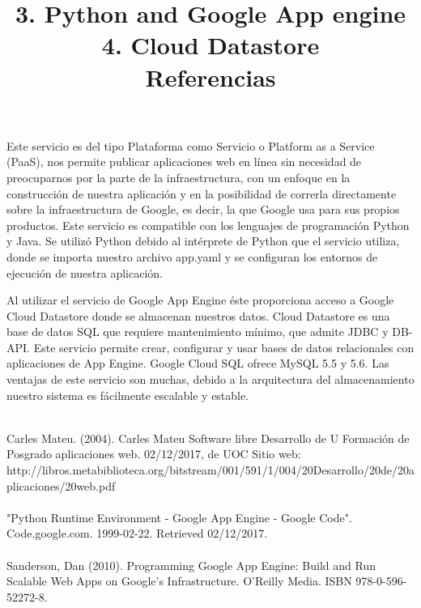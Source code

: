 \documentclass[a4paper,10pt]{article}
\begin{document}
\maketitle
\title{\textbf{\large{3. Python and Google App engine}}\\}
Este servicio es del tipo Plataforma como Servicio o Platform as a Service (PaaS), nos permite publicar aplicaciones web en línea sin necesidad de preocuparnos por la parte de la infraestructura, con un enfoque en la construcción de nuestra aplicación y en la posibilidad de correrla directamente sobre la infraestructura de Google, es decir, la que Google usa para sus propios productos. Este servicio es compatible con los lenguajes de programación Python y Java. 
Se utilizó Python debido al intérprete de Python que el servicio utiliza, donde se importa nuestro archivo app.yaml y se configuran los entornos de ejecución de nuestra aplicación.
\\
\medskip

\maketitle
\title{\textbf{\large{4. Cloud Datastore}}\\}
Al utilizar el servicio de Google App Engine éste proporciona acceso a Google Cloud Datastore donde se almacenan nuestros datos. Cloud Datastore es una base de datos SQL que requiere mantenimiento mínimo, que admite JDBC y DB-API. Este servicio permite crear, configurar y usar bases de datos relacionales con aplicaciones de App Engine. Google Cloud SQL ofrece MySQL 5.5 y 5.6.
Las ventajas de este servicio son muchas, debido a la arquitectura del almacenamiento nuestro sistema es fácilmente escalable y estable.\\
\medskip

\maketitle
\title{\textbf{\Large{Referencias}}\\}
\\Carles Mateu. (2004). Carles Mateu Software libre Desarrollo de U Formación de Posgrado aplicaciones web. 02/12/2017, de UOC Sitio web:\\ http://libros.metabiblioteca.org/bitstream/001/591/1/004/20Desarrollo/20de/20aplicaciones/20web.pdf
\\ \\
"Python Runtime Environment - Google App Engine - Google Code". Code.google.com. 1999-02-22. Retrieved 02/12/2017.
\\ \\
Sanderson, Dan (2010). Programming Google App Engine: Build and Run Scalable Web Apps on Google's Infrastructure. O'Reilly Media. ISBN 978-0-596-52272-8.
\\ \\
\medskip
\end{document}
